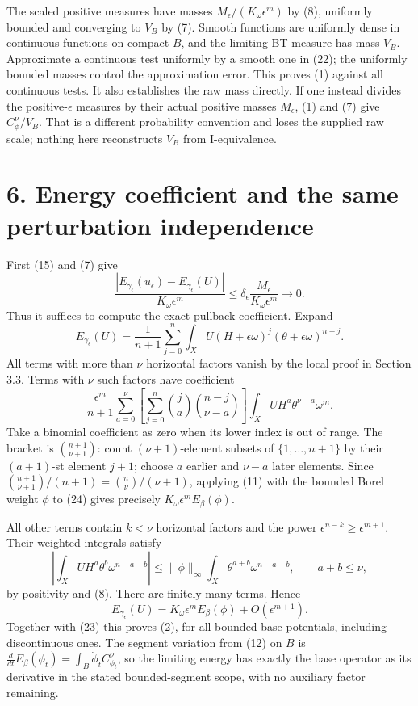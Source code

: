 \documentclass[
  11pt,
]{article}
\begin{document}
The scaled positive measures have masses \(M_\epsilon/(K_\omega\epsilon^m)\) by (8), uniformly bounded and converging to \(V_B\) by (7). Smooth functions are uniformly dense in continuous functions on compact \(B\), and the limiting BT measure has mass \(V_B\). Approximate a continuous test uniformly by a smooth one in (22); the uniformly bounded masses control the approximation error. This proves (1) against all continuous tests. It also establishes the raw mass directly. If one instead divides the positive-\(\epsilon\) measures by their actual positive masses \(M_\epsilon\), (1) and (7) give \(C_\phi^\nu/V_B\). That is a different probability convention and loses the supplied raw scale; nothing here reconstructs \(V_B\) from I-equivalence.

\section{6. Energy coefficient and the same perturbation independence}\label{energy-coefficient-and-the-same-perturbation-independence}

First (15) and (7) give \[
\frac{|E_{\gamma_\epsilon}(u_\epsilon)-E_{\gamma_\epsilon}(U)|}
 {K_\omega\epsilon^m}
\leq\delta_\epsilon\frac{M_\epsilon}{K_\omega\epsilon^m}
\longrightarrow0.                                                \tag{23}
\] Thus it suffices to compute the exact pullback coefficient. Expand \[
E_{\gamma_\epsilon}(U)=\frac1{n+1}\sum_{j=0}^n
\int_XU(H+\epsilon\omega)^j(\theta+\epsilon\omega)^{n-j}.
\] All terms with more than \(\nu\) horizontal factors vanish by the local proof in Section 3.3. Terms with \(\nu\) such factors have coefficient \[
\frac{\epsilon^m}{n+1}\sum_{a=0}^{\nu}
\left[\sum_{j=0}^n\binom ja\binom{n-j}{\nu-a}\right]
\int_X U H^a\theta^{\nu-a}\omega^m.                                \tag{24}
\] Take a binomial coefficient as zero when its lower index is out of range. The bracket is \(\binom{n+1}{\nu+1}\): count \((\nu+1)\)-element subsets of \(\{1,\ldots,n+1\}\) by their \((a+1)\)-st element \(j+1\); choose \(a\) earlier and \(\nu-a\) later elements. Since \(\binom{n+1}{\nu+1}/(n+1)=\binom n\nu/(\nu+1)\), applying (11) with the bounded Borel weight \(\phi\) to (24) gives precisely \(K_\omega\epsilon^m E_\beta(\phi)\).

All other terms contain \(k<\nu\) horizontal factors and the power \(\epsilon^{n-k}\geq\epsilon^{m+1}\). Their weighted integrals satisfy \[
\left|\int_X U H^a\theta^b\omega^{n-a-b}\right|
\leq\|\phi\|_\infty\int_X\theta^{a+b}\omega^{n-a-b},\qquad a+b\leq\nu,
\] by positivity and (8). There are finitely many terms. Hence \[
E_{\gamma_\epsilon}(U)
=K_\omega\epsilon^m E_\beta(\phi)+O(\epsilon^{m+1}).                 \tag{25}
\] Together with (23) this proves (2), for all bounded base potentials, including discontinuous ones. The segment variation from (12) on \(B\) is \(\frac{d}{dt}E_\beta(\phi_t)=\int_B\dot\phi_t C_{\phi_t}^{\nu}\), so the limiting energy has exactly the base operator as its derivative in the stated bounded-segment scope, with no auxiliary factor remaining.
\end{document}
